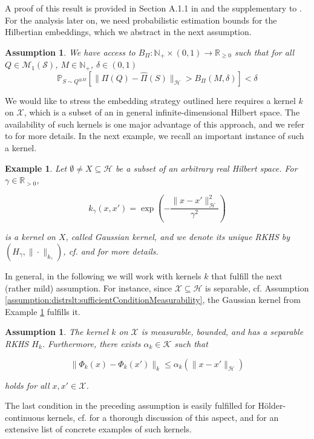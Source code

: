 \documentclass[letterpaper]{article} %
\newcommand{\R}{\mathbb{R}}
\newcommand{\Rnn}{\R_{\geq 0}}
\newcommand{\Rp}{\R_{> 0}}
\newcommand{\Np}{\mathbb{N}_+}
\newcommand{\Pb}{\mathbb{P}}
\newcommand{\distr}{\sim}
\newcommand{\fm}{\Phi} %
\newcommand{\hs}[1]{\mathcal{#1}} %
\newcommand{\cK}{\mathcal{K}} %
\newcommand{\samplingSet}{\mathcal{S}} %
\newcommand{\inputSet}{\mathcal{X}} %
\newcommand{\distributions}{\mathcal{M}_1} %
\newcommand{\hilbertianHS}{\hs{H}} %
\newcommand{\hilbertianEmbed}{\Pi} %
\newcommand{\kTwo}{k} %
\newcommand{\hilbertianEmbedBound}{B_\hilbertianEmbed} %
\newcommand{\defm}[1]{\emph{#1}}
\newcommand{\gaussianKernel}[1]{k_{#1}}
\newtheorem{assumption}[theorem]{Assumption}
\newtheorem{example}[theorem]{Example}
\newif\ifNotMuchSpace
\begin{document}
A proof of this result is provided in Section A.1.1 in \cite{szabo2015two} and the supplementary to \cite{lopezpaz2015towards}.
For the analysis later on, we need probabilistic estimation bounds for the Hilbertian embeddings, which we abstract in the next assumption.
\begin{assumption} \label{assumption:distrslt:embeddingsEstimationBounds}
We have access to $\hilbertianEmbedBound: \Np\times(0,1)\rightarrow\Rnn$ such that for all $Q\in\distributions(\samplingSet)$, $M\in\Np$, $\delta\in(0,1)$
\begin{equation*}
    \Pb_{S \distr Q^{\otimes M}}[\|\hilbertianEmbed(Q)-\hat\hilbertianEmbed(S)\|_\hilbertianHS > \hilbertianEmbedBound(M,\delta)]<\delta
\end{equation*}
\end{assumption}
We would like to stress the embedding strategy outlined here requires a kernel $k$ on $\inputSet$, which is a subset of an in general infinite-dimensional Hilbert space.
The availability of such kernels is one major advantage of this approach, and we refer to \cite{meunier2022distribution} for more details.
In the next example, we recall an important instance of such a kernel.
\begin{example} \label{example:distrslt:gaussianKernelHS}
Let $\emptyset\not=X\subseteq\hs{H}$ be a subset of an arbitrary real Hilbert space.
For $\gamma\in\Rp$,
\ifNotMuchSpace
$\gaussianKernel{\gamma}(x,x')=\exp\left(-\|x-x'\|_\hs{H}^2/\gamma^2\right)$
\else
\begin{equation*}
    \gaussianKernel{\gamma}(x,x')=\exp\left(-\frac{\|x-x'\|_\hs{H}^2}{\gamma^2}\right)
\end{equation*}
\fi
is a kernel on $X$, called \defm{Gaussian kernel}, and we denote its unique RKHS by $(H_\gamma,\|\cdot\|_{k_\gamma})$,
cf. \cite{christmann2010universal} and \cite{meunier2022distribution} for more details.
\end{example}
In general, in the following we will work with kernels $k$ that fulfill the next (rather mild) assumption.
For instance, since $\inputSet\subseteq \hilbertianHS$ is separable, cf. Assumption \ref{assumption:distrslt:sufficientConditionMeasurability}, the Gaussian kernel from Example \ref{example:distrslt:gaussianKernelHS} fulfills it.
\begin{assumption} \label{assumption:distrslt:kernelForSVM}
The kernel $k$ on $\inputSet$ is measurable, bounded, and has a separable RKHS $H_k$.
Furthermore, there exists $\alpha_k \in \cK$ such that
\ifNotMuchSpace
$  \|\fm_\kTwo(x)-\fm_\kTwo(x')\|_\kTwo \leq \alpha_\kTwo(\|x-x'\|_\hilbertianHS)$
\else
\begin{equation*}
      \|\fm_\kTwo(x)-\fm_\kTwo(x')\|_\kTwo \leq \alpha_\kTwo(\|x-x'\|_\hilbertianHS)
\end{equation*}
\fi
holds for all $x,x'\in\inputSet$.
\end{assumption}
The last condition in the preceding assumption is easily fulfilled for Hölder-continuous kernels, cf. \cite{fiedler2023lipschitz} for a thorough discussion of this aspect, and \cite{szabo2015two} for an extensive list of concrete examples of such kernels.
\end{document}
